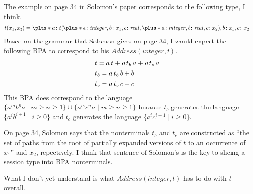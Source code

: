 \documentclass[tufte-handout]{tufte-thesis}
\begin{document}
\section{}

The example on page 34 in Solomon's paper corresponds to the following type, I think.
\begin{equation*}
  \begin{lgathered}
    t(x_1, x_2) = \plus*{a\colon t(\plus*{a\colon \mathit{integer}, b\colon x_1, c\colon \mathit{real}},
                                   \plus*{a\colon \mathit{integer}, b\colon \mathit{real}, c\colon x_2}) ,
                         b\colon x_1,
                         c\colon x_2}
  \end{lgathered}
\end{equation*}
Based on the grammar that Solomon gives on page 34, I would expect the following BPA to correspond to his $Address(integer, t)$.
\begin{equation*}
  \begin{lgathered}
    t = a\,t + a\,t_b\,a + a\,t_c\,a \\
    t_b = a\,t_b\,b + b \\
    t_c = a\,t_c\,c + c
  \end{lgathered}
\end{equation*}
This BPA does correspond to the language $\{ a^mb^na \mid m \geq n \geq 1 \} \cup \{ a^mc^na \mid m \geq n \geq 1 \}$ because $t_b$ generates the language $\{ a^ib^{i+1} \mid i \geq 0 \}$ and $t_c$ generates the language $\{ a^ic^{i+1} \mid i \geq 0 \}$.

On page 34, Solomon says that 
the nonterminals $t_b$ and $t_c$ are constructed as ``the set of paths from the root of partially expanded versions of $t$ to an occurrence of $x_1$'' and $x_2$, repectively.
I think that sentence of Solomon's is the key to slicing a session type into BPA nonterminals.

What I don't yet understand is what $\mathit{Address}(\mathit{integer},t)$ has to do with $t$ overall.
\end{document}
